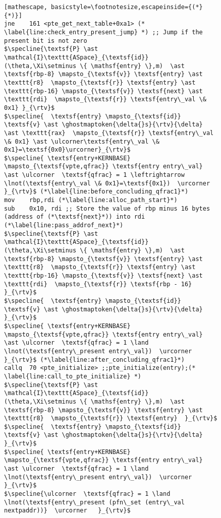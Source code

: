 \begin{figure}
\begin{lstlisting}[mathescape, basicstyle=\footnotesize,escapeinside={(*}{*)}]
jne    161 <pte_get_next_table+0xa1> (* \label{line:check_entry_present_jump} *) ;; Jump if the present bit is not zero
$\specline{\textsf{P} \ast \mathcal{I}\texttt{ASpace}_{\textsf{id}}(\theta,\Xi\setminus \{ \mathsf{entry} \},m)  \ast \textsf{rbp-8} \mapsto_{\textsf{v}} \textsf{entry} \ast \texttt{r8}  \mapsto_{\textsf{r}} \textsf{entry} \ast \texttt{rbp-16} \mapsto_{\textsf{v}} \textsf{next} \ast \texttt{rdi}  \mapsto_{\textsf{r}} \textsf{entry\_val \& 0x1} }_{\rtv}$
$\specline{  \textsf{entry} \mapsto_{\textsf{id}} \textsf{v} \ast \ghostmaptoken{\delta{}s}{\rtv}{\delta}  \ast \texttt{rax}  \mapsto_{\textsf{r}} \textsf{entry\_val \& 0x1} \ast \ulcorner\textsf{entry\_val \& 0x1}=\textsf{0x0}\urcorner}_{\rtv}$
$\specline{ \textsf{entry+KERNBASE} \mapsto_{\textsf{vpte,qfrac}} \textsf{entry entry\_val} \ast \ulcorner  \textsf{qfrac} = 1 \leftrightarrow  \lnot(\textsf{entry\_val \& 0x1}=\textsf{0x1})  \urcorner }_{\rtv}$ (*\label{line:before_concluding_qfrac1}*)
mov    rbp,rdi (*\label{line:alloc_path_start}*)
sub    0x10, rdi ;; Store the value of rbp minus 16 bytes (address of (*\textsf{next}*)) into rdi (*\label{line:pass_addrof_next}*)
$\specline{\textsf{P} \ast \mathcal{I}\texttt{ASpace}_{\textsf{id}}(\theta,\Xi\setminus \{ \mathsf{entry} \},m)  \ast \textsf{rbp-8} \mapsto_{\textsf{v}} \textsf{entry} \ast \texttt{r8}  \mapsto_{\textsf{r}} \textsf{entry} \ast \texttt{rbp-16} \mapsto_{\textsf{v}} \textsf{next} \ast \texttt{rdi}  \mapsto_{\textsf{r}} \textsf{rbp - 16} }_{\rtv}$
$\specline{  \textsf{entry} \mapsto_{\textsf{id}} \textsf{v} \ast \ghostmaptoken{\delta{}s}{\rtv}{\delta} }_{\rtv}$
$\specline{ \textsf{entry+KERNBASE} \mapsto_{\textsf{vpte,qfrac}} \textsf{entry entry\_val} \ast \ulcorner  \textsf{qfrac} = 1 \land \lnot(\textsf{entry\_present entry\_val})  \urcorner }_{\rtv}$ (*\label{line:after_concluding_qfrac1}*)
callq  70 <pte_initialize> ;;pte_initialize(entry);(* \label{line:call_to_pte_initialize} *)
$\specline{\textsf{P} \ast \mathcal{I}\texttt{ASpace}_{\textsf{id}}(\theta,\Xi\setminus \{ \mathsf{entry} \},m)  \ast \textsf{rbp-8} \mapsto_{\textsf{v}} \textsf{entry} \ast \texttt{r8}  \mapsto_{\textsf{r}} \textsf{entry}  }_{\rtv}$
$\specline{  \textsf{entry} \mapsto_{\textsf{id}} \textsf{v} \ast \ghostmaptoken{\delta{}s}{\rtv}{\delta} }_{\rtv}$
$\specline{ \textsf{entry+KERNBASE} \mapsto_{\textsf{vpte,qfrac}} \textsf{entry entry\_val} \ast \ulcorner  \textsf{qfrac} = 1 \land \lnot(\textsf{entry\_present entry\_val})  \urcorner }_{\rtv}$
$\specline{\ulcorner  \textsf{qfrac} = 1 \land \lnot(\textsf{entry\_present (pfn\_set (entry\_val nextpaddr))}  \urcorner   }_{\rtv}$

\end{lstlisting}
\end{figure}
